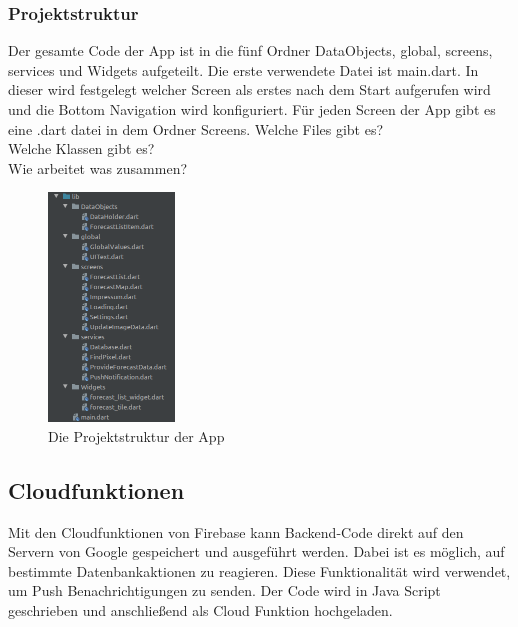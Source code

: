 \subsubsection{Projektstruktur}
Der gesamte Code der App ist in die fünf Ordner DataObjects, global, screens, services und Widgets aufgeteilt. 
Die erste verwendete Datei ist main.dart. In dieser wird festgelegt welcher Screen als erstes nach dem Start 
aufgerufen wird und die Bottom Navigation wird konfiguriert. 
Für jeden Screen der App gibt es eine .dart datei in dem Ordner Screens. 
Welche Files gibt es? \\
Welche Klassen gibt es? \\
Wie arbeitet was zusammen? \\
\begin{figure}[H]
  \centering
  \includegraphics[width=0.3\textwidth,angle=0]{abb/projektstruktur}
  \caption{Die Projektstruktur der App}
 \label{fig:projektstruktur_app}
 \end{figure}

\subsection{Cloudfunktionen}
Mit den Cloudfunktionen von Firebase kann Backend-Code direkt auf den Servern von Google gespeichert und ausgeführt werden. 
Dabei ist es möglich, auf bestimmte Datenbankaktionen zu reagieren. 
Diese Funktionalität wird verwendet, um Push Benachrichtigungen zu senden. 
Der Code wird in Java Script geschrieben und anschließend als Cloud Funktion hochgeladen.

